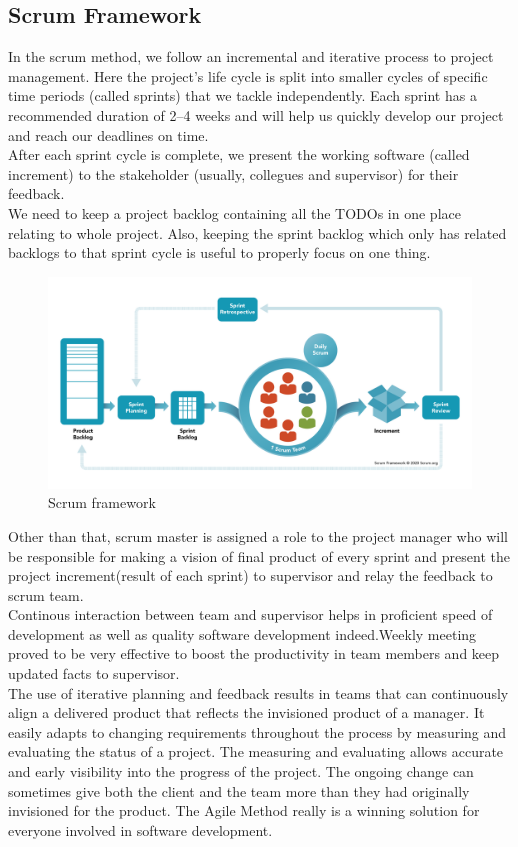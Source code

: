 \subsection{Scrum Framework}
In the scrum method, we follow an incremental and iterative process to project management.
Here the project’s life cycle is split into smaller cycles of specific time periods (called sprints) that we tackle independently. Each sprint has a recommended duration of 2–4 weeks and will help us quickly develop our project and reach our deadlines on time.\\
After each sprint cycle is complete, we present the working software (called increment) to the stakeholder (usually, collegues and supervisor) for their feedback.\\
We need to keep a project backlog containing all the TODOs in one place relating to whole project. Also, keeping the sprint backlog which only has related backlogs to that sprint cycle is useful to properly focus on one thing.\\
\begin{figure}[H]
    \centering
    \includegraphics[width=1\textwidth]{img/chapter_4/scrum.png}
    \caption{Scrum framework}
\end{figure}
\noindent
Other than that, scrum master is assigned a role to the project manager who will be responsible for making a vision of final product of every sprint and present the project increment(result of each sprint) to supervisor and relay the feedback to scrum team.\\
Continous interaction between team and supervisor helps in proficient speed of development as well as quality software development indeed.Weekly meeting proved to be very effective to boost the productivity in team members and keep updated facts to supervisor.\\

\noindent
The use of iterative planning and feedback results in teams that can
continuously align a delivered product that reflects the invisioned product of a manager.
It easily adapts to changing requirements throughout the process by measuring
and evaluating the status of a project. The measuring and evaluating allows accurate and early visibility into the progress of the project. The ongoing change
can sometimes give both the client and the team more than they had originally
invisioned for the product. The Agile Method really is a winning solution for
everyone involved in software development.\\

